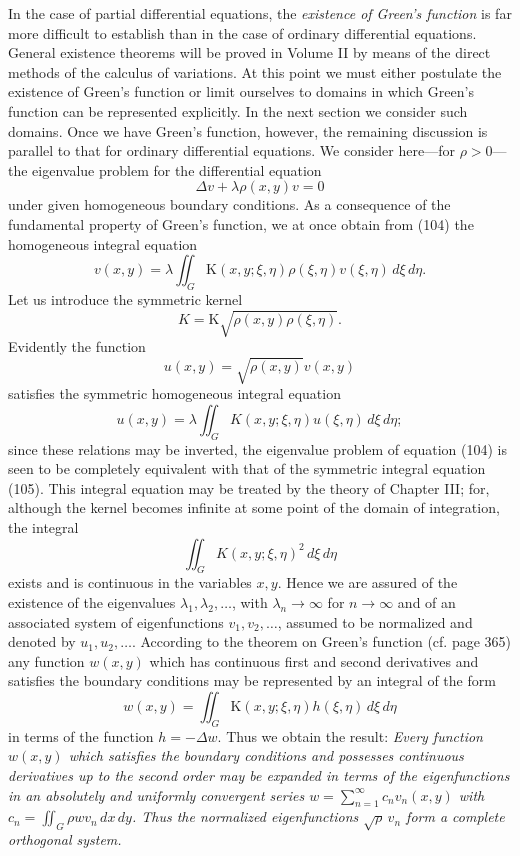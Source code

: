 In the case of partial differential equations, the \emph{existence of Green's function} is far more difficult to establish than in the case of ordinary differential equations. General existence theorems will be proved in Volume II by means of the direct methods of the calculus of variations. At this point we must either postulate the existence of Green's function or limit ourselves to domains in which Green's function can be represented explicitly. In the next section we consider such domains. Once we have Green's function, however, the remaining discussion is parallel to that for ordinary differential equations. We consider here---for $\rho>0$---the eigenvalue problem for the differential equation
\begin{equation}
\Delta v+\lambda\rho(x,y)v=0
\tag{104}
\end{equation}
under given homogeneous boundary conditions. As a consequence of the fundamental property of Green's function, we at once obtain from (104) the homogeneous integral equation
\[
v(x,y)=\lambda\iint_G\mathrm K(x,y;\xi,\eta)\rho(\xi,\eta)v(\xi,\eta)\,d\xi\,d\eta.
\]
Let us introduce the symmetric kernel
\[
K=\mathrm K\sqrt{\rho(x,y)\rho(\xi,\eta)}.
\]
Evidently the function
\[
u(x,y)=\sqrt{\rho(x,y)}v(x,y)
\]
satisfies the symmetric homogeneous integral equation
\begin{equation}
u(x,y)=\lambda\iint_G K(x,y;\xi,\eta)u(\xi,\eta)\,d\xi\,d\eta;
\tag{105}
\end{equation}
since these relations may be inverted, the eigenvalue problem of equation (104) is seen to be completely equivalent with that of the symmetric integral equation (105). This integral equation may be treated by the theory of Chapter III; for, although the kernel becomes infinite at some point of the domain of integration, the integral
\[
\iint_G K(x,y;\xi,\eta)^2\,d\xi\,d\eta
\]
exists and is continuous in the variables $x,y$. Hence we are assured of the existence of the eigenvalues $\lambda_1,\lambda_2,\ldots$, with $\lambda_n\to\infty$ for $n\to\infty$ and of an associated system of eigenfunctions $v_1,v_2,\ldots$, assumed to be normalized and denoted by $u_1,u_2,\ldots$. According to the theorem on Green's function (cf. page 365) any function $w(x,y)$ which has continuous first and second derivatives and satisfies the boundary conditions may be represented by an integral of the form
\[
w(x,y)=\iint_G\mathrm K(x,y;\xi,\eta)h(\xi,\eta)\,d\xi\,d\eta
\]
in terms of the function $h=-\Delta w$. Thus we obtain the result: \emph{Every function $w(x,y)$ which satisfies the boundary conditions and possesses continuous derivatives up to the second order may be expanded in terms of the eigenfunctions in an absolutely and uniformly convergent series $w=\sum_{n=1}^{\infty}c_nv_n(x,y)$ with $c_n=\iint_G\rho wv_n\,dx\,dy$. Thus the normalized eigenfunctions $\sqrt\rho\,v_n$ form a complete orthogonal system.}

